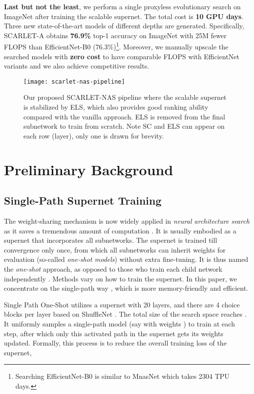 \documentclass[runningheads]{llncs}
\begin{document}
\textbf{Last but not the least}, we perform a single proxyless evolutionary search on ImageNet after training the scalable supernet. The total cost is \textbf{10 GPU days}. Three new state-of-the-art models of different depths are generated. Specifically, SCARLET-A obtains \textbf{76.9\%} top-1 accuracy on ImageNet with 25M fewer FLOPS than EfficientNet-B0 (76.3\%)\footnote{Searching EfficientNet-B0 is similar to MnasNet \cite{tan2018mnasnet} which takes 2304 TPU days.}. Moreover, we manually upscale the searched models with \textbf{zero cost} to have  comparable FLOPS with EfficientNet variants and we also achieve competitive results.

\begin{figure}[ht]
	\centering
	\texttt{[image: scarlet-nas-pipeline]}
	\vskip -0.05in
	\caption{Our proposed SCARLET-NAS pipeline where the scalable supernet is stabilized by ELS, which also provides good ranking ability compared with the vanilla approach. ELS is removed from the final subnetwork to train from scratch. Note SC and ELS can appear on each row (layer), only one is drawn for brevity.}
	\label{fig:scarlet-nas-pipeline}
\end{figure} 
 
\section{Preliminary Background}

\subsection{Single-Path Supernet Training}\label{sec:single}
The weight-sharing mechanism is now widely applied in \emph{neural architecture search} as it saves a tremendous amount of computation \cite{pham2018efficient,liu2018darts,bender2018understanding}. It is usually embodied as a supernet that incorporates all subnetworks. The supernet is trained till convergence only once, from which all subnetworks  can inherit weights for evaluation (so-called \emph{one-shot models}) without extra fine-tuning. It is thus named the \emph{one-shot} approach, as opposed to those who train each child network independently \cite{zoph2018learning,tan2018mnasnet}. Methods vary on how to train the supernet. In this paper, we concentrate on the single-path way \cite{guo2019single,chu2019fairnas}, which is more memory-friendly and efficient.

Single Path One-Shot \cite{guo2019single} utilizes a supernet  with 20 layers, and there are 4 choice blocks per layer based on ShuffleNet \cite{zhang2018shufflenet}. The total size of the search space reaches . It uniformly samples a single-path model (say  with weights ) to train at each step, after which only this activated path in the supernet gets its weights  updated. Formally, this process is to reduce the overall training loss  of the supernet,
\end{document}
